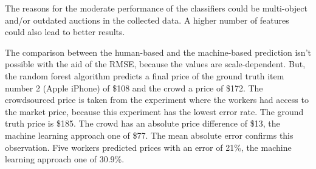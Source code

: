 The reasons for the moderate performance of the classifiers could be multi-object and/or outdated auctions in the collected data. A higher number of features could also lead to better results.

The comparison between the human-based and the machine-based prediction isn't possible with the aid of the RMSE, because the values are scale-dependent. But, the random forest algorithm predicts a final price of the ground truth item number 2 (Apple iPhone) of \$108 and the crowd a price of \$172. The crowdsourced price is taken from the experiment where the workers had access to the market price, because this experiment has the lowest error rate. The ground truth price is \$185. The crowd has an absolute price difference of \$13, the machine learning approach one of \$77. The mean absolute error confirms this observation. Five workers predicted prices with an error of 21\%, the machine learning approach one of 30.9\%.


